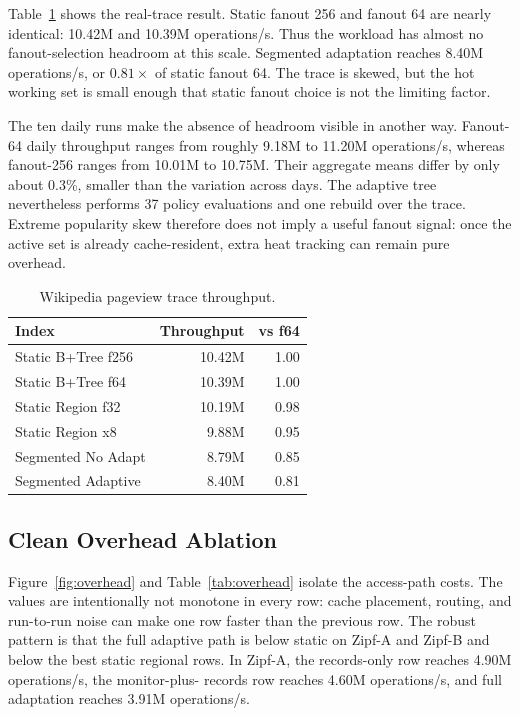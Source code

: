 \documentclass[sigconf,review,anonymous]{acmart}
\begin{document}
Table~\ref{tab:wiki} shows the real-trace result.  Static fanout 256 and
fanout 64 are nearly identical: 10.42M and 10.39M operations/s.  Thus the
workload has almost no fanout-selection headroom at this scale.  Segmented
adaptation reaches 8.40M operations/s, or \(0.81\times\) of static fanout 64.
The trace is skewed, but the hot working set is small enough that static
fanout choice is not the limiting factor.

The ten daily runs make the absence of headroom visible in another way.
Fanout-64 daily throughput ranges from roughly 9.18M to 11.20M operations/s,
whereas fanout-256 ranges from 10.01M to 10.75M.  Their aggregate means differ
by only about 0.3\%, smaller than the variation across days.  The adaptive
tree nevertheless performs 37 policy evaluations and one rebuild over the
trace.  Extreme popularity skew therefore does not imply a useful fanout
signal: once the active set is already cache-resident, extra heat tracking can
remain pure overhead.

\begin{table}[t]
\centering
\caption{Wikipedia pageview trace throughput.}
\label{tab:wiki}
\begin{tabular}{lrr}
\toprule
Index & Throughput & vs f64 \\
\midrule
Static B+Tree f256 & 10.42M & 1.00 \\
Static B+Tree f64 & 10.39M & 1.00 \\
Static Region f32 & 10.19M & 0.98 \\
Static Region x8 & 9.88M & 0.95 \\
Segmented No Adapt & 8.79M & 0.85 \\
Segmented Adaptive & 8.40M & 0.81 \\
\bottomrule
\end{tabular}
\end{table}

\subsection{Clean Overhead Ablation}

Figure~\ref{fig:overhead} and Table~\ref{tab:overhead} isolate the access-path
costs.  The values are intentionally not monotone in every row: cache
placement, routing, and run-to-run noise can make one row faster than the
previous row.  The robust pattern is that the full adaptive path is below
static on Zipf-A and Zipf-B and below the best static regional rows.  In
Zipf-A, the records-only row reaches 4.90M operations/s, the monitor-plus-
records row reaches 4.60M operations/s, and full adaptation reaches 3.91M
operations/s.
\end{document}
